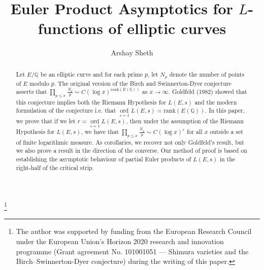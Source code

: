 \documentclass[12pt,reqno]{amsart}
\theoremstyle{definition}
\numberwithin{equation}{section}
\newcommand{\ord}{\mathop{\mathrm{ord}}}
\begin{document}
\title{Euler Product Asymptotics for $L$-functions of elliptic curves}

\author{Arshay Sheth}

\address[Arshay Sheth]{Mathematics Institute, Zeeman Building, University of Warwick, Coventry, CV4 7AL, UK}

\thanks{The author was supported by funding from the European Research Council under the European Union’s Horizon 2020 research and innovation programme (Grant agreement No. 101001051 — Shimura varieties and the Birch--Swinnerton-Dyer conjecture) during the writing of this paper.}











\begin{abstract}
Let $E/\mathbb Q$ be an elliptic curve and for each prime $p$, let $N_p$ denote the number of points of $E$ modulo $p$. The original version of the Birch and Swinnerton-Dyer conjecture asserts that $\prod \limits _{p \leq x} \frac{N_p}{p} \sim C (\log x) ^{\text{rank}(E(\mathbb Q))}$ as $x \to \infty$. Goldfeld (1982) showed that this conjecture implies both the Riemann Hypothesis for $L(E, s)$ and the modern formulation of the conjecture i.e. that $\ord \limits _{s=1} L(E, s)= \text{rank}(E(\mathbb Q))$. In this paper, we prove that if we let $r=\ord \limits_{s=1}L(E, s)$, then under the assumption of the Riemann Hypothesis for $L(E, s)$, 
we have that $\prod \limits _{p \leq x} \frac{N_p}{p}  \sim C (\log x)^r
$
for all $x$ outside a set of finite logarithmic measure. As corollaries, we recover not only Goldfeld's result, but we also prove a result in the direction of the converse. Our method of proof is based on establishing the asymptotic behaviour of partial Euler products of $L(E, s)$ in the right-half of the critical strip.  
\end{abstract}





\maketitle
\end{document}
